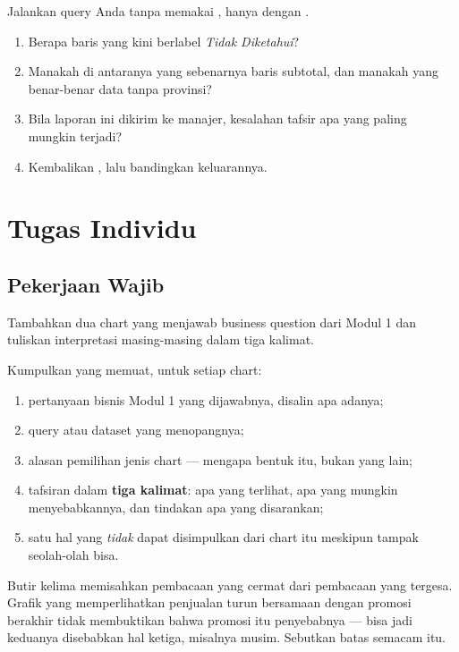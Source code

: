 
Jalankan query  Anda tanpa memakai , hanya
dengan .

\begin{enumerate}[leftmargin=1.4em]
  \item Berapa baris yang kini berlabel \emph{Tidak Diketahui}?
  \item Manakah di antaranya yang sebenarnya baris subtotal, dan manakah yang
        benar-benar data tanpa provinsi?
  \item Bila laporan ini dikirim ke manajer, kesalahan tafsir apa yang paling
        mungkin terjadi?
  \item Kembalikan , lalu bandingkan keluarannya.
\end{enumerate}

\section{Tugas Individu}

\subsection{Pekerjaan Wajib}
Tambahkan dua chart yang menjawab business question dari Modul 1 dan tuliskan
interpretasi masing-masing dalam tiga kalimat.

Kumpulkan  yang memuat, untuk setiap chart:

\begin{enumerate}[leftmargin=1.4em]
  \item pertanyaan bisnis Modul 1 yang dijawabnya, disalin apa adanya;
  \item query atau dataset yang menopangnya;
  \item alasan pemilihan jenis chart --- mengapa bentuk itu, bukan yang lain;
  \item tafsiran dalam \textbf{tiga kalimat}: apa yang terlihat, apa yang
        mungkin menyebabkannya, dan tindakan apa yang disarankan;
  \item satu hal yang \emph{tidak} dapat disimpulkan dari chart itu meskipun
        tampak seolah-olah bisa.
\end{enumerate}

\begin{catatan}
Butir kelima memisahkan pembacaan yang cermat dari pembacaan yang tergesa.
Grafik yang memperlihatkan penjualan turun bersamaan dengan promosi berakhir
tidak membuktikan bahwa promosi itu penyebabnya --- bisa jadi keduanya
disebabkan hal ketiga, misalnya musim. Sebutkan batas semacam itu.
\end{catatan}

